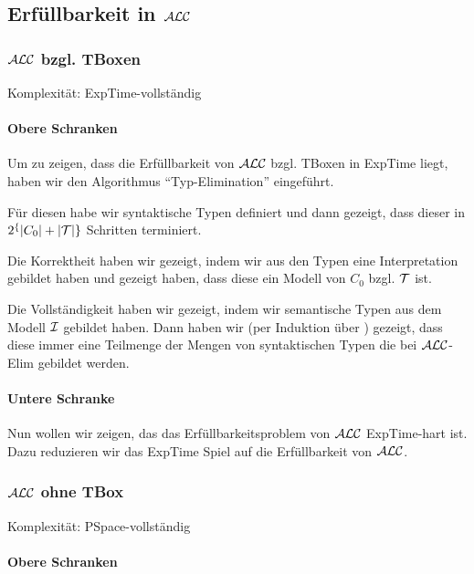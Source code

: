 \subsection{Erfüllbarkeit in \texorpdfstring{$\mathcal{A}\mathcal{L}\mathcal{C}$}{ALC}}

\subsubsection{\texorpdfstring{$\mathcal{A}\mathcal{L}\mathcal{C}$}{ALC} bzgl. TBoxen}

Komplexität: ExpTime-vollständig

\paragraph{Obere Schranken}

Um zu zeigen, dass die Erfüllbarkeit von $\mathcal{A}\mathcal{L}\mathcal{C}$ bzgl. TBoxen in ExpTime liegt, haben wir den Algorithmus ``Typ-Elimination'' eingeführt.

Für diesen habe wir syntaktische Typen definiert und dann gezeigt, dass dieser in $2^\{|C_0|+|\mathcal{T}|\}$ Schritten terminiert.

Die Korrektheit haben wir gezeigt, indem wir aus den Typen eine Interpretation gebildet haben und gezeigt haben, dass diese ein Modell von $C_0$ bzgl. $\mathcal{T}$ ist.

Die Vollständigkeit haben wir gezeigt, indem wir semantische Typen aus dem Modell $\mathcal{I}$ gebildet haben. Dann haben wir (per Induktion über ) gezeigt, dass diese immer eine Teilmenge der Mengen von syntaktischen Typen die bei $\mathcal{A}\mathcal{L}\mathcal{C}$-Elim gebildet werden.

\paragraph{Untere Schranke}

Nun wollen wir zeigen, das das Erfüllbarkeitsproblem von $\mathcal{A}\mathcal{L}\mathcal{C}$ ExpTime-hart ist. Dazu reduzieren wir das ExpTime Spiel auf die Erfüllbarkeit von $\mathcal{A}\mathcal{L}\mathcal{C}$.

\subsubsection{\texorpdfstring{$\mathcal{A}\mathcal{L}\mathcal{C}$}{ALC} ohne TBox}

Komplexität: PSpace-vollständig

\paragraph{Obere Schranken}

